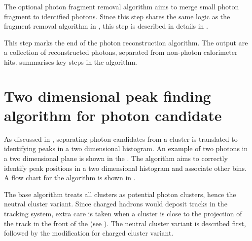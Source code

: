 The optional photon fragment removal algorithm aims to merge small photon fragment to identified photons. Since this step shares the same logic as the fragment removal algorithm in , this step is described in details in .


This step marks the end of the photon reconstruction algorithm. The output are a collection of reconstructed photons, separated from non-photon calorimeter hits.   summarises key steps in the \PhotonReconstruction algorithm.

\section{Two dimensional peak finding algorithm for photon candidate}
\label{sec:peakFinding}

As discussed in , separating photon candidates from a cluster is translated to identifying peaks in a two dimensional histogram. An example of two photons in a two dimensional plane is shown in the . The \peakFinding algorithm aims to correctly identify peak positions in a two dimensional histogram and associate other bins. A flow chart for the algorithm is shown in .

The base algorithm treats all clusters as potential photon clusters, hence the neutral cluster variant. Since charged hadrons would deposit tracks in the tracking system, extra care is taken when a cluster is close to the projection of the track in the front of the \ECAL (see ). The neutral cluster variant is described first, followed by the modification for charged cluster variant.

